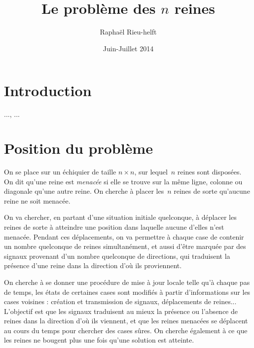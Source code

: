 \documentclass[11pt, openany, a4paper]{article}
\newcommand{\N}{\mathbb{N}}
\newcommand{\B}{\mathbb{B}}
\begin{document}
\renewcommand{\labelitemi}{$\bullet$}
\title{Le problème des $n$ reines}
\date{Juin-Juillet 2014}
\author{Raphaël Rieu-helft}
\maketitle
\section*{Introduction}

...\cite{BahiC06}, \cite{ChevFat08,Fat13}...


\section{Position du problème}
\label{sec:position}

On se place sur un échiquier de  taille $n \times n$, sur lequel~$n$ reines sont
disposées. On dit qu'une reine est  \emph{menacée} si elle se trouve sur la même
ligne,  colonne ou diagonale  qu'une autre  reine. On  cherche à  placer les~$n$
reines de sorte qu'aucune reine ne soit menacée.

On va chercher,  en partant d'une situation initiale  quelconque, à déplacer les
reines  de sorte à  atteindre une  position dans  laquelle aucune  d'elles n'est
menacée. Pendant ces déplacements, on va  permettre à chaque case de contenir un
nombre  quelconque de  reines simultanément,  et  aussi d'être  marquée par  des
signaux  provenant  d'un nombre  quelconque  de  directions,  qui traduisent  la
présence d'une reine dans la direction d'où ils proviennent.



On cherche à se donner une procédure de mise à jour locale telle qu'à chaque pas
de temps, les états de certaines cases sont modifiés à partir d'informations sur
les  cases voisines  :  création  et transmission  de  signaux, déplacements  de
reines...  L'objectif est que  les signaux  traduisent au  mieux la  présence ou
l'absence  de reines  dans la  direction d'où  ils viennent,  et que  les reines
menacées  se déplacent  au cours  du  temps pour  chercher des  cases sûres.  On
cherche également à  ce que les reines ne bougent plus  une fois qu'une solution
est atteinte.
\end{document}
